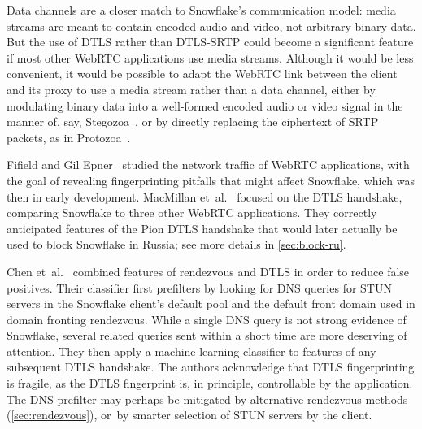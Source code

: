 \documentclass[letterpaper,twocolumn]{article}
\begin{document}
\begin{description}
Data channels are a closer match to Snowflake's communication model:
media streams are meant to contain encoded audio and video,
not arbitrary binary data.
But the use of DTLS rather than DTLS-SRTP could become
a significant feature if most other WebRTC applications use media streams.
Although it would be less convenient,
it would be possible to adapt the WebRTC link between
the client and its proxy
to use a media stream rather than a data channel,
either by modulating binary data into a well-formed encoded
audio or video signal in the manner of, say,
Stegozoa~\cite[\S 3.3]{Figueira2022a},
or by directly replacing the ciphertext of SRTP packets,
as in Protozoa~\cite[\S 4.4]{Barradas2020a}.

\end{description}


Fifield and Gil Epner~\cite{arxiv.1605.08805}
studied the network traffic of WebRTC applications,
with the goal of revealing fingerprinting pitfalls
that might affect Snowflake, which was then in early development.
MacMillan et~al.~\cite{arxiv.2008.03254}
focused on the DTLS handshake,
comparing Snowflake to three other WebRTC applications.
They correctly anticipated features
of the Pion DTLS handshake
that would later actually be used
to block Snowflake in Russia;
see more details in \autoref{sec:block-ru}.

Chen et~al.~\cite{Chen2023a}
combined features
of rendezvous and DTLS
in order to reduce false positives.
Their classifier first prefilters
by looking for DNS queries for
STUN servers in the Snowflake client's default pool
and the default front domain used in
domain fronting rendezvous.
While a single DNS query is not strong evidence of Snowflake,
several related queries sent within a short time
are more deserving of attention.
They then apply a machine learning classifier
to features of any subsequent DTLS handshake.
The authors acknowledge that DTLS fingerprinting
is fragile, as the DTLS fingerprint is, in principle,
controllable by the application.
The DNS prefilter may perhaps be mitigated
by alternative rendezvous methods (\autoref{sec:rendezvous}),
or~by smarter selection of STUN servers by the client.
\end{document}
